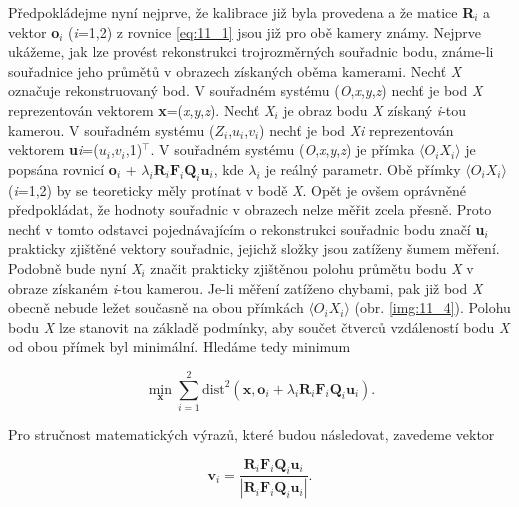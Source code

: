 Předpokládejme nyní nejprve, že kalibrace již byla provedena a že matice \textbf{R}$_i$ a vektor \textbf{o}$_{i}$ (\textit{i}=1,2) z rovnice \eqref{eq:11_1} jsou již pro obě kamery známy. Nejprve ukážeme, jak lze provést rekonstrukci trojrozměrných souřadnic bodu, známe-li souřadnice jeho průmětů v obrazech získaných oběma kamerami. Nechť \textit{X} označuje rekonstruovaný bod. V souřadném systému (\textit{O},\textit{x},\textit{y},\textit{z}) nechť je bod \textit{X} reprezentován vektorem \textbf{x}=(\textit{x},\textit{y},\textit{z}). Nechť \textit{X}$_i$ je obraz bodu \textit{X} získaný \textit{i}-tou kamerou. V souřadném systému ($Z_i$,$u_i$,$v_i$) nechť je bod \textit{Xi} reprezentován vektorem \textbf{u}\textit{i}=($u_i$,$v_i$,1)$^\top$. V souřadném systému (\textit{O},\textit{x},\textit{y},\textit{z}) je přímka $\langle O_i X_i \rangle$ je popsána rovnicí \textbf{o}$_{i}$ + $\lambda_i \mathbf{R}_i \mathbf{F}_i \mathbf{Q}_i \mathbf{u}_i$, kde $\lambda_{i}$ je reálný parametr. Obě přímky $\langle O_i X_i \rangle$ (\textit{i}=1,2) by se teoreticky měly protínat v bodě \textit{X}. Opět je ovšem oprávněné předpokládat, že hodnoty souřadnic v obrazech nelze měřit zcela přesně. Proto nechť v tomto odstavci pojednávajícím o rekonstrukci souřadnic bodu značí \textbf{u}$_i$ prakticky zjištěné vektory souřadnic, jejichž složky jsou zatíženy šumem měření. Podobně bude nyní \textit{X}$_i$ značit prakticky zjištěnou polohu průmětu bodu \textit{X} v obraze získaném \textit{i}-tou kamerou. Je-li měření zatíženo chybami, pak již bod \textit{X} obecně nebude ležet současně na obou přímkách $\langle O_i X_i \rangle$ (obr. \ref{img:11_4}). Polohu bodu \textit{X} lze stanovit na základě podmínky, aby součet čtverců vzdáleností bodu \textit{X} od obou přímek byl minimální. Hledáme tedy minimum

\begin{equation} \label{eq:11_21}
    \min\limits_{\mathbf{x}} \sum_{i=1}^{2}\mathrm{dist}^{2} \left(\mathbf{x}, \mathbf{o}_{i} + \lambda_{i} \mathbf{R}_{i} \mathbf{F}_{i} \mathbf{Q}_{i} \mathbf{u}_{i} \right) .
\end{equation}

Pro stručnost matematických výrazů, které budou následovat, zavedeme vektor

\begin{equation} \label{eq:11_22}
    \mathbf{v}_{i} = \frac{\mathbf{R}_{i} \mathbf{F}_{i} \mathbf{Q}_{i} \mathbf{u}_{i}}{\left|\mathbf{R}_{i} \mathbf{F}_{i} \mathbf{Q}_{i} \mathbf{u}_{i} \right|} .  
\end{equation}

